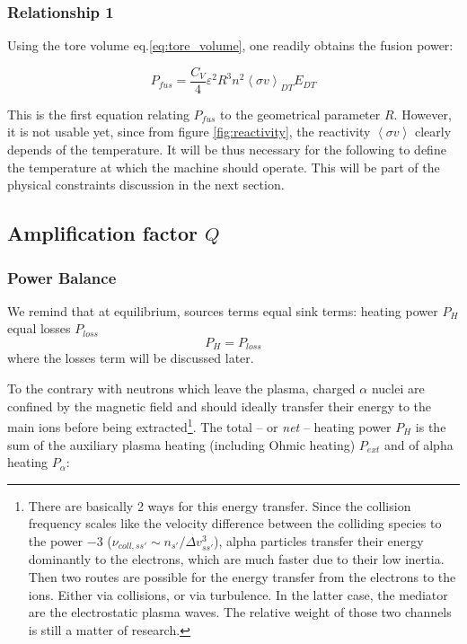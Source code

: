 \subsubsection{Relationship 1}
Using the tore volume eq.\ref{eq:tore_volume}, one readily obtains the fusion power:

\begin{equation}
\boxed{
	P_{fus} = \frac{C_V}{4}
  				\varepsilon^2 R^3
				n^2 \left< \sigma v \right>_{DT} E_{DT}
	}
	\label{eq:FusionPower1}
\end{equation}

This is the first equation relating $P_{fus}$ to the geometrical parameter $R$. However, it is not usable yet, since from figure \ref{fig:reactivity}, the reactivity $\left< \sigma v \right>$ clearly depends of the temperature. It will be thus necessary for the following to define the temperature at which the machine should operate. This will be part of the physical constraints discussion in the next section. 

\subsection{Amplification factor $Q$}
\subsubsection{Power Balance}
We remind that at equilibrium, sources terms equal sink terms: heating power $P_H$ equal losses $P_{loss}$
\begin{equation}
	P_H = P_{loss}
	\label{eq:power_balance_general}
\end{equation}
where the losses term will be discussed later.


To the contrary with neutrons which leave the plasma, charged $\alpha$ nuclei are confined by the magnetic field and should ideally transfer their energy to the main ions before being extracted\footnote{There are basically 2 ways for this energy transfer. Since the collision frequency scales like the velocity difference between the colliding species to the power $-3$ ($\nu_{coll,ss'}\sim n_{s'}/\Delta v_{ss'}^3$), alpha particles transfer their energy dominantly to the electrons, which are much faster due to their low inertia. Then two routes are possible for the energy transfer from the electrons to the ions. Either via collisions, or via turbulence. In the latter case, the mediator are the electrostatic plasma waves. The relative weight of those two channels is still a matter of research.}. The total -- or \emph{net} -- heating power $P_H$ is the sum of the auxiliary plasma heating (including Ohmic heating) $P_{ext}$ and of alpha heating $P_\alpha$:

